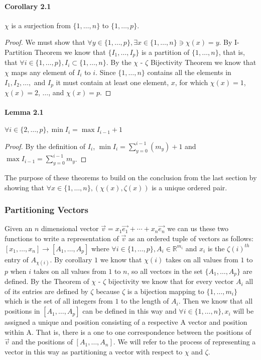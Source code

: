 \documentclass{article}
\begin{document}
\paragraph{Corollary 2.1}
$\chi$ is a surjection from $\{1, \ldots, n\}$ to $\{1, \ldots, p\}$.
\begin{proof}
We must show that $\forall y \in \{1, \ldots, p\}, \exists x \in \{1, \ldots, n\} \ni \chi(x) = y$. By I-Partition Theorem we know that $\{I_1, \ldots, I_p\}$ is a partition of $\{1, \ldots, n\}$, that is, that $\forall i \in \{1, \ldots, p\}, I_i \subset \{1, \ldots, n\}$. By the $\chi$ - $\zeta$ Bijectivity Theorem we know that $\chi$ maps any element of $I_i$ to $i$. Since $\{1, \ldots, n\}$ contains all the elements in $I_1, I_2, \ldots,$ and $I_p$ it must contain at least one element, $x$, for which $\chi(x) = 1$, $\chi(x) = 2$, $\ldots$, and $\chi(x) = p$.
\end{proof}
\paragraph{Lemma 2.1}
$\forall i \in \{2, \ldots, p\}, \min{I_i}  = \max{I_{i - 1}} + 1$
\begin{proof}
By the definition of $I_i$, $\min{I_i} = \sum_{y = 0}^{i - 1}(m_y) + 1$ and $\max{I_{i - 1}} = \sum_{y = 0}^{i - 1}m_y$.
\end{proof}
The purpose of these theorems to build on the conclusion from the last section by showing that $\forall x \in \{1, \ldots, n\}, (\chi(x), \zeta(x))$ is a unique ordered pair.
\subsubsection{Partitioning Vectors}
Given an $n$ dimensional vector $\vec{v} = x_1\vec{e_1} + \cdots + x_n\vec{e_n}$ we can us these two functions to write a representation of $\vec{v}$ as an ordered tuple of vectors as follows: $[x_1, \ldots, x_n] \rightarrow [A_1, \ldots, A_p]$ where $\forall i \in \{1, \ldots, p\}, A_i \in \mathbb{R}^{m_i}$ and $x_i$ is the $\zeta(i)^{th}$ entry of $A_{\chi(i)}$. By corollary $1$ we know that $\chi(i)$ takes on all values from $1$ to $p$ when $i$ takes on all values from $1$ to $n$, so all vectors in the set $\{A_1, \ldots, A_p\}$ are defined. By the Theorem of $\chi$ - $\zeta$ bijectivity we know that for every vector $A_i$ all of its entries are defined by $\zeta$ because $\zeta$ is a bijection mapping to $\{1, \ldots, m_i\}$ which is the set of all integers from $1$ to the length of $A_i$. Then we know that all positions in $[A_1, \ldots, A_p]$ can be defined in this way and $\forall i \in \{1, \ldots, n\}, x_i$ will be assigned a unique and position consisting of a respective A vector and position within A. That is, there is a one to one correspondence between the positions of $\vec{v}$ and the positions of $[A_1, \ldots, A_n]$. We will refer to the process of representing a vector in this way as partitioning a vector with respect to $\chi$ and $\zeta$.
\end{document}
